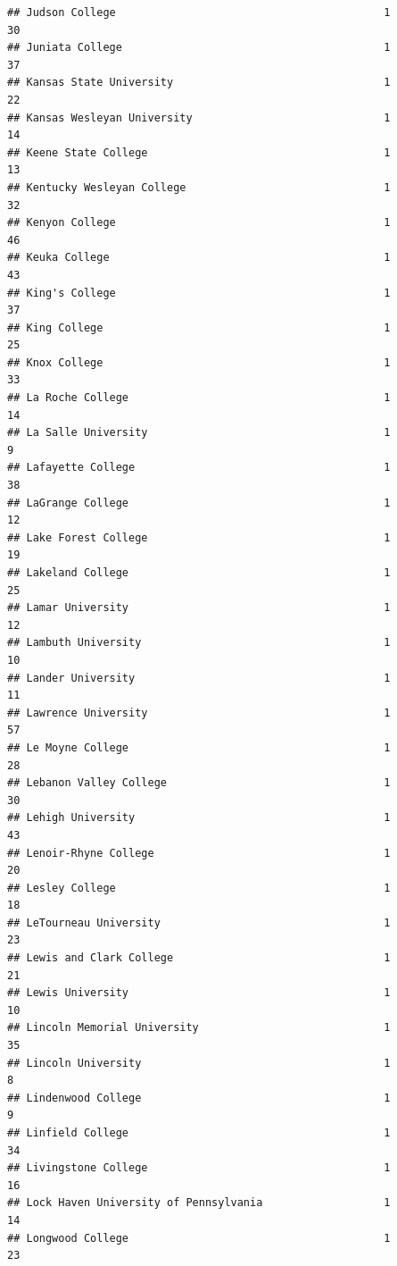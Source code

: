 \documentclass[
]{article}
\begin{document}
\begin{verbatim}
## Judson College                                          1          30
## Juniata College                                         1          37
## Kansas State University                                 1          22
## Kansas Wesleyan University                              1          14
## Keene State College                                     1          13
## Kentucky Wesleyan College                               1          32
## Kenyon College                                          1          46
## Keuka College                                           1          43
## King's College                                          1          37
## King College                                            1          25
## Knox College                                            1          33
## La Roche College                                        1          14
## La Salle University                                     1           9
## Lafayette College                                       1          38
## LaGrange College                                        1          12
## Lake Forest College                                     1          19
## Lakeland College                                        1          25
## Lamar University                                        1          12
## Lambuth University                                      1          10
## Lander University                                       1          11
## Lawrence University                                     1          57
## Le Moyne College                                        1          28
## Lebanon Valley College                                  1          30
## Lehigh University                                       1          43
## Lenoir-Rhyne College                                    1          20
## Lesley College                                          1          18
## LeTourneau University                                   1          23
## Lewis and Clark College                                 1          21
## Lewis University                                        1          10
## Lincoln Memorial University                             1          35
## Lincoln University                                      1           8
## Lindenwood College                                      1           9
## Linfield College                                        1          34
## Livingstone College                                     1          16
## Lock Haven University of Pennsylvania                   1          14
## Longwood College                                        1          23

\end{verbatim}
\end{document}
